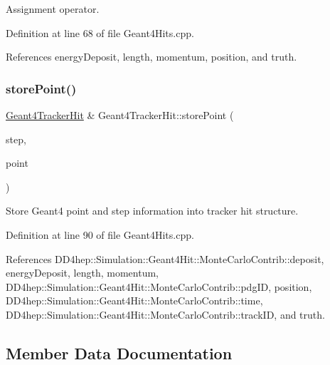 Assignment operator. 



Definition at line 68 of file Geant4\+Hits.\+cpp.



References energy\+Deposit, length, momentum, position, and truth.

\hypertarget{class_d_d4hep_1_1_simulation_1_1_geant4_tracker_hit_a1c59f0271ec61e504bf572ed4e9b2bb0}{}\label{class_d_d4hep_1_1_simulation_1_1_geant4_tracker_hit_a1c59f0271ec61e504bf572ed4e9b2bb0} 
\subsubsection{\texorpdfstring{store\+Point()}{storePoint()}}
{\footnotesize\ttfamily \hyperlink{class_d_d4hep_1_1_simulation_1_1_geant4_tracker_hit}{Geant4\+Tracker\+Hit} \& Geant4\+Tracker\+Hit\+::store\+Point (\begin{DoxyParamCaption}\item[{G4\+Step $\ast$}]{step,  }\item[{G4\+Step\+Point $\ast$}]{point }\end{DoxyParamCaption})}



Store Geant4 point and step information into tracker hit structure. 



Definition at line 90 of file Geant4\+Hits.\+cpp.



References D\+D4hep\+::\+Simulation\+::\+Geant4\+Hit\+::\+Monte\+Carlo\+Contrib\+::deposit, energy\+Deposit, length, momentum, D\+D4hep\+::\+Simulation\+::\+Geant4\+Hit\+::\+Monte\+Carlo\+Contrib\+::pdg\+ID, position, D\+D4hep\+::\+Simulation\+::\+Geant4\+Hit\+::\+Monte\+Carlo\+Contrib\+::time, D\+D4hep\+::\+Simulation\+::\+Geant4\+Hit\+::\+Monte\+Carlo\+Contrib\+::track\+ID, and truth.



\subsection{Member Data Documentation}
\hypertarget{class_d_d4hep_1_1_simulation_1_1_geant4_tracker_hit_a0af1fbbb8d345344c088b8596b97998f}{}\label{class_d_d4hep_1_1_simulation_1_1_geant4_tracker_hit_a0af1fbbb8d345344c088b8596b97998f} 
